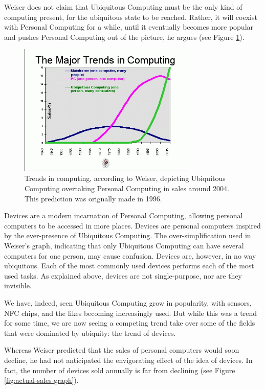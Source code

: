 Weiser does not claim that Ubiquitous Computing must be the only kind of computing present, for the ubiquitous state to be reached.
Rather, it will coexist with Personal Computing for a while, until it eventually becomes more popular and pushes Personal Computing
out of the picture, he argues (see Figure \ref{fig:trends-graph}).

\begin{figure}[htb]
	\centering
	\includegraphics[width=0.75\textwidth]{multipurpose/trends-graph}
	\caption{Trends in computing, according to Weiser, depicting Ubiquitous Computing overtaking Personal Computing in sales around
		2004. This prediction was orignally made in 1996.\cite{weisernomadic}}
	\label{fig:trends-graph}
\end{figure}

Devices are a modern incarnation of Personal Computing, allowing personal computers to be accessed in more places. Devices are personal
computers inspired by the ever-presence of Ubiquitous Computing. The over-simplification used in Weiser's graph, indicating that only
Ubiquitous Computing can have several computers for one person, may cause confusion. Devices are, however, in no way ubiquitous. Each
of the most commonly used devices performs each of the most used tasks. As explained above, devices are not single-purpose, nor are they
invisible.

We have, indeed, seen Ubiquitous Computing grow in popularity, with sensors, NFC chips, and the likes becoming increasingly used. But
while this was a trend for some time, we are now seeing a competing trend take over some of the fields that were dominated by ubiquity:
the trend of devices.

Whereas Weiser predicted that the sales of personal computers would soon decline, he had not anticipated the envigorating effect of the
idea of devices. In fact, the number of devices sold annually is far from declining (see Figure \ref{fig:actual-sales-graph}).

